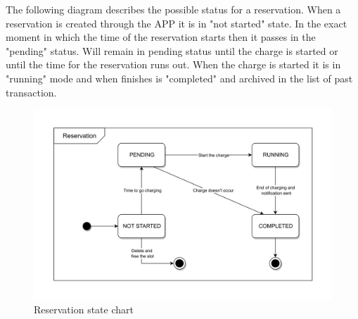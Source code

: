 The following diagram describes the possible status for a reservation.
When a reservation is created through the APP it is in "not started" state. In the exact moment in which the time of the reservation starts
then it passes in the "pending" status. Will remain in pending status until the charge is started or until the time for the reservation runs out.
When the charge is started it is in "running" mode and when finishes is "completed" and archived in the list of past transaction.

\begin{figure}[H]
      \centering
      \includegraphics[scale=0.25]{src/state_diagram/transaction.png}
      \caption{Reservation state chart}
\end{figure} \vspace{1cm}

